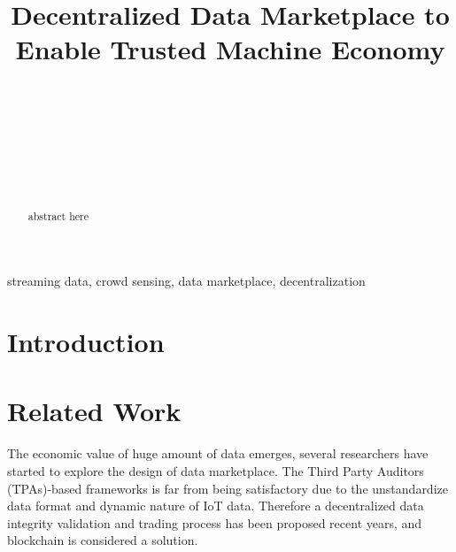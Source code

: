 \documentclass[journal,a4paper]{IEEEtran}
\begin{document}
%
\title{Decentralized Data Marketplace to Enable Trusted Machine Economy}
%
\author{
\\

 \\
 \\
 \\

 \\

 \\

}


%


\maketitle              
\begin{abstract}
abstract here
\end{abstract}

\begin{IEEEkeywords}
streaming data, crowd sensing, data marketplace, decentralization
\end{IEEEkeywords}

\section{Introduction}

\section{Related Work}
The economic value of huge amount of data emerges, several researchers have started to explore the design of data marketplace. The Third Party Auditors (TPAs)-based frameworks is far from being satisfactory due to the unstandardize data format and dynamic nature of IoT data. Therefore a decentralized data integrity validation and trading process has been proposed recent years, and blockchain is considered a solution.
\end{document}
